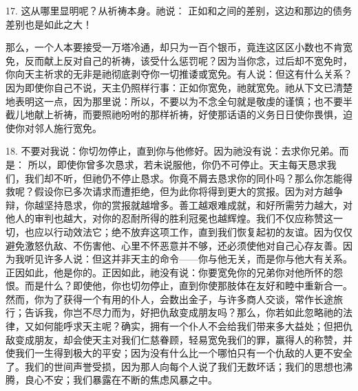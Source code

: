 17. 这从哪里显明呢？从祈祷本身。祂说： 正如和之间的差别，这边和那边的债务差别也是如此之大！\par

那么，一个人本要接受一万塔冷通，却只为一百个银币，竟连这区区小数也不肯宽免，反而献上反对自己的祈祷，该受什么惩罚呢？因为当你念，过后却不宽免时，你向天主祈求的无非是祂彻底剥夺你一切推诿或宽免。有人说：但这有什么关系？因为即使你自己不说，天主仍照样行事：正如你宽免，祂就宽免。祂从下文已清楚地表明这一点，因为那里说：所以，不要以为不念全句就是敬虔的谨慎；也不要半截儿地献上祈祷，而要照祂吩咐的那样祈祷，好使那话语的义务日日使你畏惧，迫使你对邻人施行宽免。\par

18. 不要对我说：你切勿停止，直到你与他修好。因为祂没有说：去求你兄弟。而是： 所以，即使你曾多次恳求，若未说服他，你仍不可停止。天主每天恳求我们，我们却不听，但祂仍不停止恳求。你竟不屑去恳求你的同仆吗？那么你怎能得救呢？假设你已多次请求而遭拒绝，但为此你将得到更大的赏报。因为对方越争辩，你越坚持恳求，你的赏报就越增多。善工越艰难成就，和好所需劳力越大，对他人的审判也越大，对你的忍耐所得的胜利冠冕也越辉煌。我们不仅应称赞这一切，也应以行动效法它；绝不放弃这项工作，直到我们恢复起初的友谊。因为仅仅避免激怒仇敌、不伤害他、心里不怀恶意并不够，还必须使他对自己心存友善。因为我听见许多人说：但这并非天主的命令——你与他无关，而是你与他大有关系。正因如此，他是你的。正因如此，祂没有说：你要宽免你的兄弟你对他所怀的怨恨。而是什么？即使他，你也切勿停止，直到你使那肢体在友好和睦中重新合一。然而，你为了获得一个有用的仆人，会数出金子，与许多商人交谈，常作长途旅行；告诉我，你岂不尽力而为，好把仇敌变成朋友吗？那么，你若如此忽略祂的法律，又如何能呼求天主呢？确实，拥有一个仆人不会给我们带来多大益处；但把仇敌变成朋友，却会使天主对我们仁慈眷顾，轻易宽免我们的罪，赢得人的称赞，并使我们一生得到极大的平安；因为没有什么比一个哪怕只有一个仇敌的人更不安全了。我们的世间声誉受损，因为那人向每个人说了我们无数坏话；我们的思想也沸腾，良心不安；我们暴露在不断的焦虑风暴之中。\par

